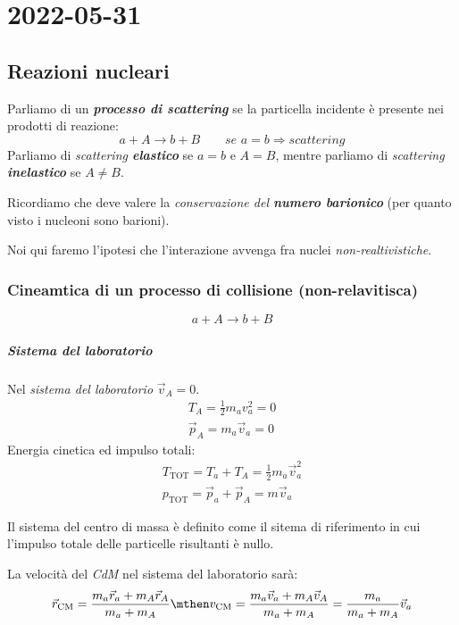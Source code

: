 \chapter{2022-05-31}
\section{Reazioni nucleari}
\begin{definition}
  Parliamo di un \textit{\textbf{processo di scattering}} se la particella
  incidente è presente nei prodotti di reazione:
  \[
    a + A \longrightarrow b + B
    \qquad
    \textit{se } a = b \Rightarrow \textit{scattering}
  \]
  Parliamo di \textit{scattering \textbf{elastico}} se $a = b$ e $A = B$,
  mentre parliamo di \textit{scattering \textbf{inelastico}} se $A \neq B$.
\end{definition}

\begin{note}[]
  Ricordiamo che deve valere la \textit{conservazione del \textbf{numero
  barionico}} (per quanto visto i nucleoni sono barioni).
\end{note}

\begin{note}[]
  Noi qui faremo l'ipotesi che l'interazione avvenga fra nuclei
  \textit{non-realtivistiche}.
\end{note}

\subsection{Cineamtica di un processo di collisione (non-relavitisca)}
\[
  a + A \longrightarrow b + B
\]

\paragraph{Sistema del laboratorio}
Nel \textit{sistema del laboratorio} $\vec{v}_{A} = 0$.
\begin{align*}
  T_A = \frac{1}{2} m_a v_{a}^{2} = 0
  \\
  \vec{p}_{A} = m_a \vec{v}_{a} = 0
\end{align*}
Energia cinetica ed impulso totali:
\begin{align*}
  T_\text{TOT} = T_a + T_A = \frac{1}{2} m_a \vec{v}_{a}^2
  \\
  p_\text{TOT} = \vec{p}_{a} + \vec{p}_{A} = m \vec{v}_{a}
\end{align*}
\begin{note}[]
  Il sistema del centro di massa è definito come il sitema di riferimento in
  cui l'impulso totale delle particelle risultanti è nullo.
\end{note}
La velocità del \textit{CdM} nel sistema del laboratorio sarà:
\[
  \vec{r}_\text{CM} = \frac{m_a \vec{r}_{a} + m_A \vec{r}_{A}}{m_a + m_A}
  \mthen
  v _\text{CM} = \frac{m_a \vec{v}_{a} + m_A \vec{v}_{A}}{m_a + m_A} =
  \frac{m_a}{m_a + m_A} \vec{v}_{a}
\]

